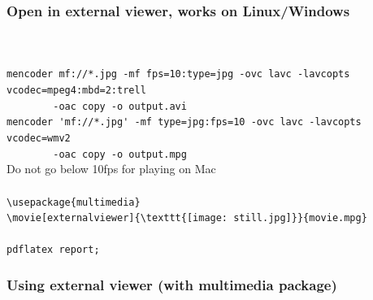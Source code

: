\documentclass{beamer}
\begin{document}


\begin{frame}[fragile]
  \frametitle{Open in external viewer, works on Linux/Windows}
  \\[0.3cm]
  \\[0.1cm]
  {\tiny
    \hspace*{1cm}\verb|mencoder mf://*.jpg -mf fps=10:type=jpg -ovc lavc -lavcopts vcodec=mpeg4:mbd=2:trell|\\
    \hspace*{1cm}\verb|        -oac copy -o output.avi|\\[0.1cm]
    \hspace*{1cm}\verb|mencoder 'mf://*.jpg' -mf type=jpg:fps=10 -ovc lavc -lavcopts vcodec=wmv2|\\
    \hspace*{1cm}\verb|        -oac copy -o output.mpg|\\[0.1cm]
    \hspace*{1cm}Do not go below 10fps for playing on Mac\\[0.3cm]
  }
  \\[0.1cm]
  {\tiny
    \hspace*{1cm}\verb|\usepackage{multimedia}|\\[0.1cm]
    \hspace*{1cm}\verb|\movie[externalviewer]{\texttt{[image: still.jpg]}}{movie.mpg}|\\[0.3cm]
  }
  \\[0.1cm]
  {\tiny
    \hspace*{1cm}\verb|pdflatex report;|\\[0.3cm]
  }
\end{frame}


\begin{frame}
  \frametitle{Using external viewer (with multimedia package)}
  \begin{center}
  \end{center}
\end{frame}
\end{document}
